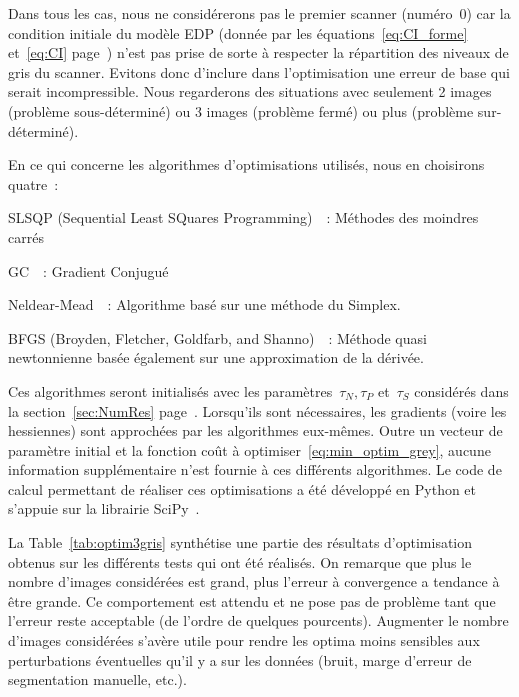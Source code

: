 \documentclass[main.tex]{subfiles}
\begin{document}
Dans tous les cas, nous ne considérerons pas le premier scanner (numéro~0) car la condition initiale du modèle EDP (donnée par les équations~\eqref{eq:CI_forme} et~\eqref{eq:CI} page~\pageref{eq:CI_forme}) n'est pas prise de sorte à respecter la répartition des niveaux de gris du scanner. Evitons donc d'inclure dans l'optimisation une erreur de base qui serait incompressible. Nous regarderons des situations avec seulement 2 images (problème sous-déterminé) ou 3 images (problème fermé) ou plus (problème sur-déterminé).

En ce qui concerne les algorithmes d'optimisations utilisés, nous en choisirons quatre~:
\begin{myitemize}
\item SLSQP (Sequential Least SQuares Programming)~\cite{kraft1988software}~: Méthodes des moindres carrés 
\item GC~\cite{nocedal2006numerical}~: Gradient Conjugué
\item Neldear-Mead~\cite{nelder1965simplex,wright1996direct,wright2010nelder}~: Algorithme basé sur une méthode du Simplex.
\item BFGS (Broyden, Fletcher, Goldfarb, and Shanno)~\cite{nocedal2006numerical}~: Méthode quasi newtonnienne basée  également sur une approximation de la dérivée.
\end{myitemize}
Ces algorithmes seront initialisés avec les paramètres~$\tau_N, \tau_P$ et~$\tau_S$ considérés dans la section~\ref{sec:NumRes} page~\pageref{sec:NumRes}. Lorsqu'ils sont nécessaires, les gradients (voire les hessiennes) sont approchées par les algorithmes eux-mêmes. Outre un vecteur de paramètre initial et la fonction coût à optimiser~\eqref{eq:min_optim_grey}, aucune information supplémentaire n'est fournie à ces différents algorithmes. Le code de calcul permettant de réaliser ces optimisations a été développé en Python et s'appuie sur la librairie SciPy~\cite{jones2014scipy}.  



La Table~\ref{tab:optim3gris} synthétise une partie des résultats d'optimisation obtenus sur les différents tests qui ont été réalisés. 
On remarque que plus le nombre d'images considérées est grand, plus l'erreur à convergence a tendance à être grande. Ce comportement est attendu et ne pose pas de problème tant que l'erreur reste acceptable (de l'ordre de quelques pourcents). Augmenter le nombre d'images considérées s'avère utile pour rendre les optima moins sensibles aux perturbations éventuelles qu'il y a sur les données (bruit, marge d'erreur de segmentation manuelle, etc.).
\end{document}
